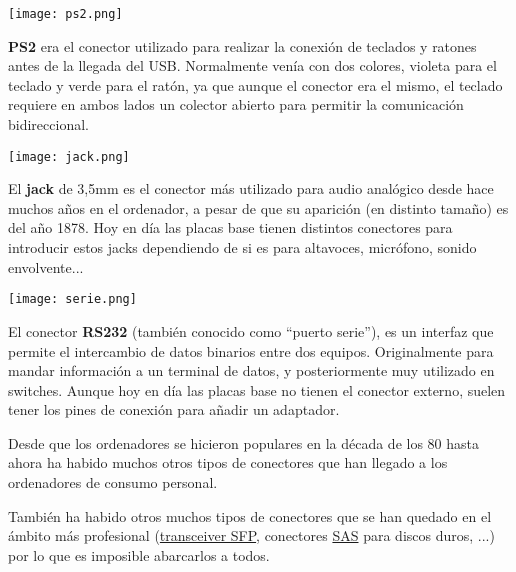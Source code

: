 \vspace{12pt}
\begin{minipage}{0.15\linewidth}
    \texttt{[image: ps2.png]}
\end{minipage}
\hfill
\begin{minipage}{0.8\linewidth}
    \textbf{PS\/2} era el conector utilizado para realizar la conexión de teclados y ratones antes de la llegada del USB. Normalmente venía con dos colores, violeta para el teclado y verde para el ratón, ya que aunque el conector era el mismo, el teclado requiere en ambos lados un colector abierto para permitir la comunicación bidireccional.
\end{minipage}

\vspace{12pt}
\begin{minipage}{0.15\linewidth}
    \texttt{[image: jack.png]}
\end{minipage}
\hfill
\begin{minipage}{0.8\linewidth}
    El \textbf{jack} de 3,5mm es el conector más utilizado para audio analógico desde hace muchos años en el ordenador, a pesar de que su aparición (en distinto tamaño) es del año 1878. Hoy en día las placas base tienen distintos conectores para introducir estos jacks dependiendo de si es para altavoces, micrófono, sonido envolvente...
\end{minipage}


\vspace{12pt}
\begin{minipage}{0.15\linewidth}
    \texttt{[image: serie.png]}
\end{minipage}
\hfill
\begin{minipage}{0.8\linewidth}
    El conector \textbf{RS232} (también conocido como “puerto serie”), es un interfaz que permite el intercambio de datos binarios entre dos equipos. Originalmente para mandar información a un terminal de datos, y posteriormente muy utilizado en switches. Aunque hoy en día las placas base no tienen el conector externo, suelen tener los pines de conexión para añadir un adaptador.
\end{minipage}


Desde que los ordenadores se hicieron populares en la década de los 80 hasta ahora ha habido muchos otros tipos de conectores que han llegado a los ordenadores de consumo personal.

También ha habido otros muchos tipos de conectores que se han quedado en el ámbito más profesional (\href{https://es.wikipedia.org/wiki/Transceptor_SFP}{transceiver SFP}, conectores \href{https://es.wikipedia.org/wiki/Serial_Attached_SCSI}{SAS} para discos duros, ...) por lo que es imposible abarcarlos a todos.


